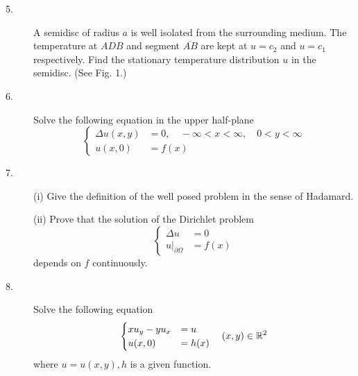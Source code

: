 \documentclass{article}
\begin{document}
\begin{description}
\item[5.]
A semidisc of radius $a$ is well isolated from the surrounding medium. The
temperature at $ADB$ and segment $\overline{AB}$ are kept at
$u = c_2$ and $u=c_1$ respectively. Find the stationary temperature
distribution $u$ in the semidisc. (See Fig. 1.)

\item[6.]
Solve the following equation in the upper half-plane
$$\begin{cases}
        \Delta u (x,y) &=0, \quad -\infty < x < \infty, \quad 0< y< \infty \\
        u(x,0) &=f(x)
        \end{cases}$$

\item[7.] (i)
Give the definition of the well posed problem in the sense of Hadamard.

\item[\quad] (ii)
Prove that the solution of the Dirichlet problem
$$\begin{cases}
        \Delta u &= 0 \\
        u|_{\partial \Omega} &= f(x)
        \end{cases}$$
depends on $f$ continuously.

\item[8.]
Solve the following equation
$$\begin{cases}
        xu_y - yu_x &= u \\
        u(x,0) &=h(x)
        \end{cases}
        \quad (x,y) \in \Bbb R^2$$
where $u = u(x,y), h$ is a given function.        









\end{description}    
\end{document}
